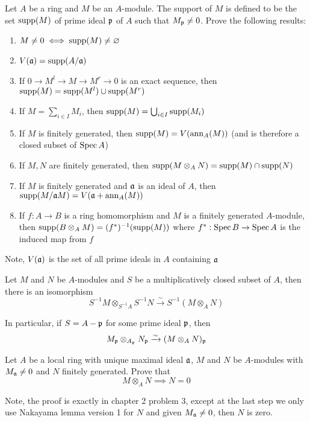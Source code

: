 \begin{problem}
	Let $A$ be a ring and $M$ be an $A$-module. The support of $M$ is defined to be the set $\operatorname{supp}(M)$ of prime ideal $\mathfrak{p}$ of $A$ such that $M_{\mathfrak{p}} \neq 0$. Prove the following results:
	\begin{enumerate}
		\item $M \neq 0 \iff \operatorname{supp}(M) \neq \varnothing$
		\item $V(\mathfrak{a}) = \operatorname{supp}(A / \mathfrak{a})$
		\item If $0 \to M^l \to M \to M^r \to 0$ is an exact sequence, then $\operatorname{supp} (M) = \operatorname{supp} (M^l) \cup \operatorname{supp}(M^r)$
		\item If $M = \sum_{i \in I} M_i$, then $\operatorname{supp}(M) = \bigcup_{i \in I} \operatorname{supp}(M_i)$ 
		\item If $M$ is finitely generated, then $\operatorname{supp}(M) = V(\operatorname{ann}_A(M))$ (and is therefore a closed subset of $\operatorname{Spec} A$)
		\item If $M, N$ are finitely generated, then $\operatorname{supp} (M \otimes_A N) = \operatorname{supp}(M) \cap \operatorname{supp}(N)$
		\item If $M$ is finitely generated and $\mathfrak{a}$ is an ideal of $A$, then $\operatorname{supp}(M / \mathfrak{a}M) = V(\mathfrak{a} + \operatorname{ann}_A(M))$
		\item If $f: A \to B$ is a ring homomorphism and $M$ is a finitely generated $A$-module, then $\operatorname{supp}(B \otimes_A M) = (f^*)^{-1}(\operatorname{supp} (M))$ where $f^*: \operatorname{Spec} B \to \operatorname{Spec} A$ is the induced map from $f$
	\end{enumerate}
	
	Note, $V(\mathfrak{a})$ is the set of all prime ideals in $A$ containing $\mathfrak{a}$
\end{problem}

\begin{lemma}
	\label{lemma_3_7}
	Let $M$ and $N$ be $A$-modules and $S$ be a multiplicatively closed subset of $A$, then there is an isomorphism
	$$
		S^{-1} M \otimes_{S^{-1} A} S^{-1} N \xrightarrow{\sim} S^{-1} (M \otimes_A N)
	$$
	
	In particular, if $S = A - \mathfrak{p}$ for some prime ideal $\mathfrak{p}$, then
	$$
		M_{\mathfrak{p}} \otimes_{A_{\mathfrak{p}}} N_{\mathfrak{p}} \xrightarrow{\sim} (M \otimes_A N)_{\mathfrak{p}}
	$$
\end{lemma}

\begin{lemma}
	\label{lemma_2_3_e}
	Let $A$ be a local ring with unique maximal ideal $\mathfrak{a}$, $M$ and $N$ be $A$-modules with $M_{\mathfrak{a}} \neq 0$ and $N$ finitely generated. Prove that 
	$$
		M \otimes_A N \implies N = 0
	$$
	
	Note, the proof is exactly in chapter 2 problem 3, except at the last step we only use Nakayama lemma version 1 for $N$ and given $M_{\mathfrak{a}} \neq 0$, then $N$ is zero.
\end{lemma}

